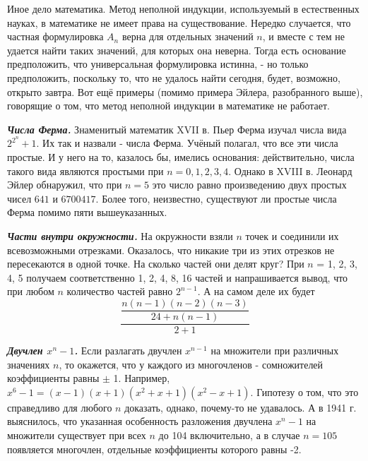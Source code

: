 \par
Иное дело математика. Метод неполной индукции, используемый в естественных науках, в математике не имеет права на существование. Нередко случается, что частная формулировка $A_n$ верна для отдельных значений $n$, и вместе с тем не удается найти таких значений, для которых она неверна. Тогда есть основание предположить, что универсальная формулировка истинна, - но только предположить, поскольку то, что не удалось найти сегодня, будет, возможно, открыто завтра. Вот ещё примеры (помимо примера
Эйлера, разобранного выше), говорящие о том, что метод неполной индукции в математике не работает.

\par

\textbf{\textit{Числа Ферма.}} Знаменитый математик XVII в. Пьер Ферма изучал числа вида $2^{2^n} + 1$. Их так и назвали - числа Ферма. Учёный полагал, что все эти числа простые. И у него на то, казалось бы, имелись основания: действительно, числа такого вида являются простыми при $n = 0, 1, 2, 3, 4$. Однако в XVIII в. Леонард Эйлер обнаружил, что при $n = 5$ это число равно произведению двух простых чисел $641$ и $6700417$. Более того, неизвестно, существуют ли простые числа Ферма помимо пяти вышеуказанных.

\par

\textbf{\textit{Части внутри окружности.}} На окружности взяли $n$ точек и соединили их всевозможными отрезками. Оказалось, что никакие три из этих отрезков не пересекаются в одной точке. На сколько частей они делят круг? При $n$ = 1, 2, 3, 4, 5 получаем соответственно 1, 2, 4, 8, 16 частей и напрашивается вывод, что
при любом $n$ количество частей равно $2^{n-1}$. А на самом деле их будет $$\dfrac{\dfrac{n(n - 1)(n - 2)(n - 3)}{24 + n(n - 1)}}{2+1}$$

\par

\textbf{\textit{Двучлен $x^n - 1$.}} Если разлагать двучлен $x^{n - 1}$ на множители при различных значениях $n$, то окажется, что у каждого из многочленов - сомножителей коэффициенты равны $\pm$ 1. Например, $x^6 - 1 = (x - 1)(x + 1)(x^2 + x + 1)(x^2 - x + 1)$. Гипотезу о том, что это справедливо для любого $n$ доказать, однако, почему-то не удавалось. А в 1941 г. выяснилось, что указанная особенность разложения двучлена $x^n - 1$ на множители существует при всех $n$ до 104 включительно, а в случае $n = 105$ появляется многочлен, отдельные коэффициенты которого равны -2.

